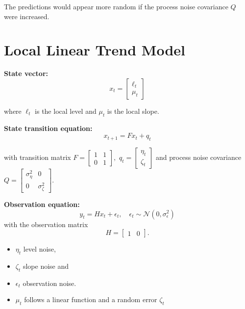 The predictions would appear more random if the process noise covariance $Q$ were increased. 




\newpage
\section*{Local Linear Trend Model}

\medskip
\noindent 
\textbf{State vector:}
\[x_t= \begin{bmatrix} 
                \ell_t \\ 
                \mu_t 
            \end{bmatrix}\]

where $\ell_t$ is the local level and $\mu_t$ is the local slope.

\medskip
\noindent
\textbf{State transition equation:}
$$x_{t+1} = Fx_t + q_t$$ 

with transition matrix
$F=\begin{bmatrix} 
        1 & 1 \\ 
        0 & 1
    \end{bmatrix},$
$q_t = \begin{bmatrix}
    \eta_t \\ \zeta_t
\end{bmatrix}$
and process noise covariance
$Q=\begin{bmatrix} 
        \sigma^2_\eta & 0 \\ 
        0 & \sigma^2_\zeta 
    \end{bmatrix}.$

\medskip
\noindent     
\textbf{Observation equation:}
\[
y_t = Hx_t+\epsilon_t, \quad \epsilon_t \sim \mathcal{N}(0, \sigma^2_\epsilon)
\]
with the observation matrix \[H=\begin{bmatrix} 1 & 0 \end{bmatrix}.\]
\begin{itemize}
    \item $\eta_t$ level noise, 
    \item $\zeta_t$ slope noise and
    \item $\epsilon_t$ observation noise. 
    \item $\mu_t$ follows a linear function and a random error $\zeta_t$
\end{itemize}

